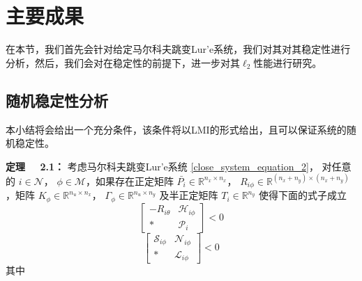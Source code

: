 \section{主要成果}
	在本节，我们首先会针对给定马尔科夫跳变Lur'e系统，我们对其对其稳定性进行分析，然后，我们会对在稳定性的前提下，进一步对其$\ell_2$性能进行研究。

\subsection{随机稳定性分析}
	本小结将会给出一个充分条件，该条件将以LMI的形式给出，且可以保证系统的随机稳定性。
	
	{\bf 定理 \ \ 2.1：}
	考虑马尔科夫跳变Lur'e系统 \eqref{close_system_equation_2}， 对任意的 $i \in \mathcal{N}$， $\phi \in \mathcal{M}$，如果存在正定矩阵 $\bar{P_i} \in \mathbb{R}^{n_x\times n_x}$， $R_{i\phi } \in \mathbb{R}^{(n_x+n_y)\times(n_x+n_y)}$，矩阵 $K_{\phi} \in \mathbb{R}^{n_u\times n_x}$， $\varGamma_{\phi} \in \mathbb{R}^{n_u \times n_y}$ 及半正定矩阵 $T_{i}\in \mathbb{R}^{n_y}$ 使得下面的式子成立
	\begin{equation}\label{condition_1_1}
	\begin{bmatrix}
	-R_{i\theta}&\mathscr{H}_{i\phi}\\
	*&\mathscr{P}_{i}
	\end{bmatrix}<0
	\end{equation}
	\begin{equation}\label{condition_1_2}
	\begin{bmatrix}
	\mathscr{S}_{i\phi}&\mathscr{N}_{i\phi}\\
	*&\mathscr{L}_{i\phi}
	\end{bmatrix}<0
	\end{equation}
	其中
